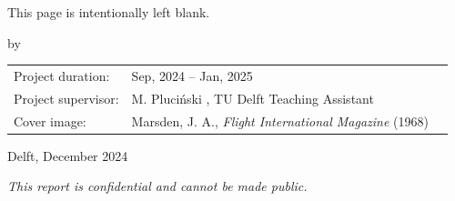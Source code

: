 \thispagestyle{empty}
\vspace{2cm}
\begin{center}
    This page is intentionally left blank.
\end{center}
\newpage


\begin{titlepage}


\begin{center}


{\makeatletter
\largetitlestyle\fontsize{26}{26}\selectfont\@title
\makeatother}

{\makeatletter
\ifx\@subtitle\undefined\else
    \bigskip
   {\tudsffamily\fontsize{22}{32}\selectfont\@subtitle}    
\fi
\makeatother}

\bigskip
\bigskip

by

\bigskip
\bigskip

{\makeatletter
\largetitlestyle\fontsize{26}{26}\selectfont\@author \makeatother}

\bigskip
\bigskip


\vfill

\begin{tabular}{lll}
  
    Project duration: & \multicolumn{2}{l}{Sep, 2024 -- Jan, 2025} \\
    Project supervisor: & M. Pluciński , TU Delft Teaching Assistant \\
    Cover image:   & Marsden, J. A., \textit{Flight International Magazine} (1968) \cite{Marsden1968Flight94}\\
\end{tabular} 

\bigskip
\bigskip
Delft, December 2024

\bigskip
\bigskip
\emph{This report is confidential and cannot be made public.}






\end{center}
\end{titlepage}
